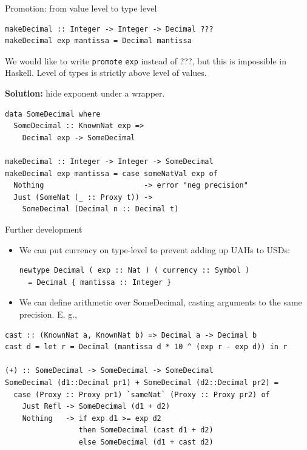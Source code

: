 \documentclass[handout]{beamer}
\begin{document}
\begin{frame}[fragile]{Promotion: from value level to type level}

\begin{lstlisting}
makeDecimal :: Integer -> Integer -> Decimal ???
makeDecimal exp mantissa = Decimal mantissa
\end{lstlisting}

We would like to write {\tt promote} {\tt exp} instead of ???,
but this is impossible in Haskell.
Level of types is strictly above level of values.

\bigskip

{\bf Solution:} hide exponent under a wrapper.

\begin{lstlisting}
data SomeDecimal where
  SomeDecimal :: KnownNat exp =>
    Decimal exp -> SomeDecimal

makeDecimal :: Integer -> Integer -> SomeDecimal
makeDecimal exp mantissa = case someNatVal exp of
  Nothing                       -> error "neg precision"
  Just (SomeNat (_ :: Proxy t)) ->
    SomeDecimal (Decimal n :: Decimal t)
\end{lstlisting}

\end{frame}

\begin{frame}[fragile]{Further development}
\begin{adjustwidth}{-2.3em}{-2.3em}

\begin{itemize}

\item We can put currency on type-level to prevent adding up UAHs to USDs:

\begin{lstlisting}
newtype Decimal ( exp :: Nat ) ( currency :: Symbol )
  = Decimal { mantissa :: Integer }
\end{lstlisting}

\item We can define arithmetic over SomeDecimal, casting arguments
  to the same precision. E. g.,

\end{itemize}

\begin{lstlisting}
cast :: (KnownNat a, KnownNat b) => Decimal a -> Decimal b
cast d = let r = Decimal (mantissa d * 10 ^ (exp r - exp d)) in r

(+) :: SomeDecimal -> SomeDecimal -> SomeDecimal
SomeDecimal (d1::Decimal pr1) + SomeDecimal (d2::Decimal pr2) =
  case (Proxy :: Proxy pr1) `sameNat` (Proxy :: Proxy pr2) of
    Just Refl -> SomeDecimal (d1 + d2)
    Nothing   -> if exp d1 >= exp d2
                 then SomeDecimal (cast d1 + d2)
                 else SomeDecimal (d1 + cast d2)
\end{lstlisting}

\end{adjustwidth}
\end{frame}
\end{document}
